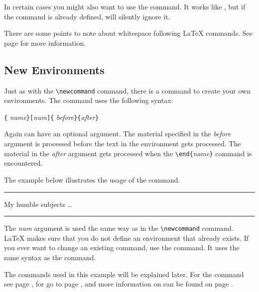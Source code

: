 In certain cases you might also want to use the 
command. It works like , but if the command is
already defined, \LaTeXe{} will silently ignore it.

There are some points to note about whitespace following \LaTeX{} commands. See
page \pageref{whitespace} for more information.

\subsection{New Environments}
Just as with the \verb|\newcommand| command, there is a command
to create your own environments. The  command uses the
following syntax:

\begin{lscommand}
\verb|{|%
       \emph{name}\verb|}[|\emph{num}\verb|]{|%
       \emph{before}\verb|}{|\emph{after}\verb|}|
\end{lscommand}

Again  can have
an optional argument. The material specified
in the \emph{before} argument is processed before the text in the 
environment gets processed. The material in the \emph{after} argument gets
processed when the \verb|\end{|\emph{name}\verb|}| command is encountered.

The example below illustrates the usage of the 
command. 
\begin{example}
\newenvironment{king}
 {\rule{1ex}{1ex}%
      \hspace{\stretch{1}}}
 {%
      \rule{1ex}{1ex}}

\begin{king} 
My humble subjects \ldots
\end{king}
\end{example}

The \emph{num} argument is used the same way as in the
\verb|\newcommand| command. \LaTeX{} makes sure that you do not define
an environment that already exists. If you ever want to change an
existing command, use the  command. It
uses the same syntax as the  command.

The commands used in this example will be explained later. For the
 command see page \pageref{sec:rule}, for  go to
page \pageref{cmd:stretch}, and more information on  can be
found on page \pageref{sec:hspace}.


